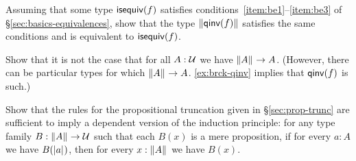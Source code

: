 \begin{ex}\label{ex:brck-qinv}
  Assuming that some type $\mathsf{isequiv}(f)$ satisfies conditions~\ref{item:be1}--\ref{item:be3} of \S\ref{sec:basics-equivalences}, show that the type $\Vert \mathsf{qinv}(f)\Vert_{}$ satisfies the same conditions and is equivalent to $\mathsf{isequiv}(f)$.
\end{ex}

\begin{ex}
  Show that it is not the case that for all $A:\mathcal{U}$ we have $\Vert A\Vert_{} \to A$.
  (However, there can be particular types for which $\Vert A\Vert_{}\to A$.
  \autoref{ex:brck-qinv} implies that $\mathsf{qinv}(f)$ is such.)
\end{ex}

\begin{ex}
  Show that the rules for the propositional truncation given in \S\ref{sec:prop-trunc} are sufficient to imply a dependent version of the induction principle: for any type family $B:\Vert A\Vert_{} \to \mathcal{U}$ such that each $B(x)$ is a mere proposition, if for every $a:A$ we have $B(|a|_{})$, then for every $x:\Vert A\Vert_{}$ we have $B(x)$.
\end{ex}


